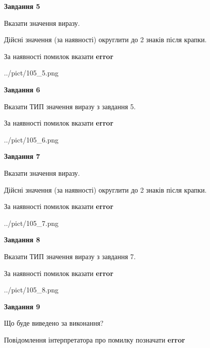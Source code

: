 \documentclass[11pt, ukrainian]{article}
\begin{document}
{\begin {large}
{\begin {center}\textbf{Завдання 5}\end {center}}\par
Вказати значення виразу. \par
Дійсні значення (за наявності) округлити до 2 знаків після крапки. \par
За наявності помилок вказати \textbf{error}

\begin{center}
	{../pict/105_5.png}
\end{center}
\newpage

{\begin {center}\textbf{Завдання 6}\end {center}}\par
Вказати ТИП значення виразу з завдання 5. \par
За наявності помилок вказати \textbf{error}

\begin{center}
	{../pict/105_6.png}
\end{center}
\newpage

{\begin {center}\textbf{Завдання 7}\end {center}}\par
Вказати значення виразу. \par
Дійсні значення (за наявності) округлити до 2 знаків після крапки. \par
За наявності помилок вказати \textbf{error}

\begin{center}
	{../pict/105_7.png}
\end{center}
\newpage

{\begin {center}\textbf{Завдання 8}\end {center}}\par
Вказати ТИП значення виразу з завдання 7. \par
За наявності помилок вказати \textbf{error}

\begin{center}
	{../pict/105_8.png}
\end{center}
\newpage

{\begin {center}\textbf{Завдання 9}\end {center}}\par
Що буде виведено за виконання? \par
Повідомлення інтерпретатора про помилку позначати \textbf{error}


\end{large}}
\end{document}
